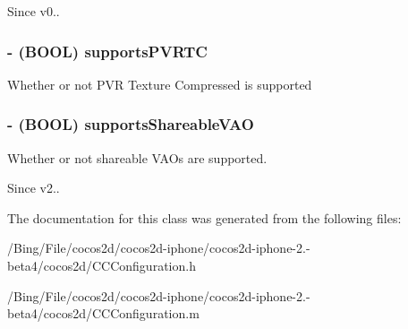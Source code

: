 \begin{DoxySince}{Since}
v0.. 
\end{DoxySince}
\hypertarget{interface_c_c_configuration_a2d9f6433a251a61dfb1b120aed830840}{
\subsubsection[{supports\-P\-V\-R\-T\-C}]{\setlength{\rightskip}{0pt plus 5cm}-\/ (B\-O\-O\-L) {\bf supports\-P\-V\-R\-T\-C}}}\label{interface_c_c_configuration_a2d9f6433a251a61dfb1b120aed830840}
Whether or not P\-V\-R Texture Compressed is supported \hypertarget{interface_c_c_configuration_a9f955f4b66edfc2391c08df18cddad62}{
\subsubsection[{supports\-Shareable\-V\-A\-O}]{\setlength{\rightskip}{0pt plus 5cm}-\/ (B\-O\-O\-L) {\bf supports\-Shareable\-V\-A\-O}}}\label{interface_c_c_configuration_a9f955f4b66edfc2391c08df18cddad62}
Whether or not shareable V\-A\-Os are supported. \begin{DoxySince}{Since}
v2.. 
\end{DoxySince}


The documentation for this class was generated from the following files\-:\begin{DoxyCompactItemize}
\item 
/\-Bing/\-File/cocos2d/cocos2d-\/iphone/cocos2d-\/iphone-\/2.-\/beta4/cocos2d/C\-C\-Configuration.\-h\item 
/\-Bing/\-File/cocos2d/cocos2d-\/iphone/cocos2d-\/iphone-\/2.-\/beta4/cocos2d/C\-C\-Configuration.\-m\end{DoxyCompactItemize}
